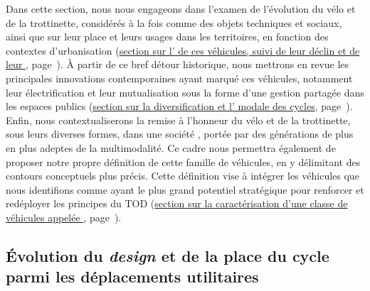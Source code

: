 \begin{refsegment}
Dans cette section, nous nous engageons dans l'examen de l’évolution du vélo et de la trottinette, considérés à la fois comme des objets techniques et sociaux, ainsi que sur leur place et leurs usages dans les territoires, en fonction des contextes d’urbanisation (\hyperref[chap1:proximite-velo-trottinette]{section sur l' de ces véhicules, suivi de leur déclin et de leur }, page~\pageref{chap1:proximite-velo-trottinette}). À partir de ce bref détour historique, nous mettrons en revue les principales innovations contemporaines ayant marqué ces véhicules, notamment leur électrification et leur mutualisation sous la forme d'une gestion partagée dans les espaces publics (\hyperref[chap1:velo-micromobilite-innovations]{section sur la diversification et l' modale des cycles}, page~\pageref{chap1:velo-micromobilite-innovations}). Enfin, nous contextualiserons la remise à l'honneur du vélo et de la trottinette, sous leurs diverses formes, dans une société , portée par des générations de plus en plus adeptes de la \gls{multimodalité}. Ce cadre nous permettra également de proposer notre propre définition de cette famille de véhicules, en y délimitant des contours conceptuels plus précis. Cette définition vise à intégrer les véhicules que nous identifions comme ayant le plus grand potentiel stratégique pour renforcer et redéployer les principes du \acrshort{TOD} (\hyperref[chap1:caracterisation-mobilite-individuelle-legere]{section sur la caractérisation d’une classe de véhicules appelée }, page~\pageref{chap1:caracterisation-mobilite-individuelle-legere}).%

\subsection{Évolution du \textsl{design} et de la place du cycle parmi les déplacements utilitaires
    \label{chap1:proximite-velo-trottinette}
    }


\end{refsegment}
